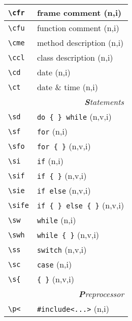 \documentclass[oneside,10pt,a4paper,DIV24]{scrartcl}
\begin{document}
\begin{center}
\begin{tabular}[]{|p{14mm}|p{58mm}|}
\hline \verb'\cfr'& frame comment                           \hfill (n,i)\\
\hline \verb'\cfu'& function comment                        \hfill (n,i)\\
\hline \verb'\cme'& method description                      \hfill (n,i)\\
\hline \verb'\ccl'& class description                       \hfill (n,i)\\
\hline \verb'\cd' & date                                    \hfill (n,i)\\
\hline \verb'\ct' & date \& time                            \hfill (n,i)\\
\hline 
\hline
\multicolumn{2}{|r|}{\textsl{\textbf{S}tatements}} \\
\hline \verb'\sd'  & \verb'do { } while'        \hfill (n,v,i)\\
\hline \verb'\sf'  & \verb'for'                 \hfill (n,i)\\
\hline \verb'\sfo' & \verb'for { }'             \hfill (n,v,i)\\
\hline \verb'\si'  & \verb'if'                  \hfill (n,i)\\
\hline \verb'\sif' & \verb'if { }'              \hfill (n,v,i)\\
\hline \verb'\sie' & \verb'if else'             \hfill (n,v,i)\\
\hline \verb'\sife'& \verb'if { } else { }'     \hfill (n,v,i)\\
\hline \verb'\sw'  & \verb'while'               \hfill (n,i)\\
\hline \verb'\swh' & \verb'while { }'           \hfill (n,v,i)\\
\hline \verb'\ss'  & \verb'switch'              \hfill (n,v,i)\\
\hline \verb'\sc'  & \verb'case'                \hfill (n,i)\\
\hline \verb'\s{'  & \verb'{ }'                 \hfill (n,v,i)\\
\hline
\hline
\multicolumn{2}{|r|}{\textsl{\textbf{P}reprocessor}}   \\
\hline \verb'\p<'   & \verb$#include<...>$         \hfill (n,i)\\

\end{tabular}
\end{center}
\end{document}
